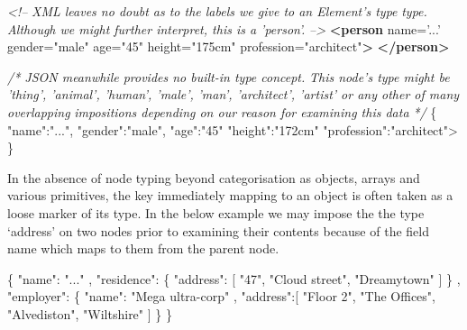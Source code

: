 \documentclass[12pt, ]{article}
\newenvironment{Shaded}{}{}
\newcommand{\KeywordTok}[1]{\textcolor[rgb]{0.00,0.44,0.13}{\textbf{{#1}}}}
\newcommand{\StringTok}[1]{\textcolor[rgb]{0.25,0.44,0.63}{{#1}}}
\newcommand{\CommentTok}[1]{\textcolor[rgb]{0.38,0.63,0.69}{\textit{{#1}}}}
\newcommand{\OtherTok}[1]{\textcolor[rgb]{0.00,0.44,0.13}{{#1}}}
\newcommand{\NormalTok}[1]{{#1}}
\begin{document}
\begin{Shaded}
\begin{Highlighting}[]
\CommentTok{<!--  }
\CommentTok{  XML leaves no doubt as to the labels we give to an Element's type }
\CommentTok{  type. Although we might further interpret, this is a 'person'.}
\CommentTok{-->}
\KeywordTok{<person}\OtherTok{  name=}\StringTok{'...'}\OtherTok{ gender=}\StringTok{"male"}
\OtherTok{         age=}\StringTok{"45"}\OtherTok{ height=}\StringTok{"175cm"}\OtherTok{ profession=}\StringTok{"architect"}\KeywordTok{>}
\KeywordTok{</person>}
\end{Highlighting}
\end{Shaded}

\begin{Shaded}
\begin{Highlighting}[]
\CommentTok{/* JSON meanwhile provides no built-in type concept. }
\CommentTok{   This node's type might be 'thing', 'animal', 'human', 'male',}
\CommentTok{   'man', 'architect', 'artist' or any other of many overlapping}
\CommentTok{   impositions depending on our reason for examining this data}
\CommentTok{*/}
\NormalTok{\{  }\StringTok{"name"}\NormalTok{:}\StringTok{"..."}\NormalTok{, }\StringTok{"gender"}\NormalTok{:}\StringTok{"male"}\NormalTok{, }\StringTok{"age"}\NormalTok{:}\StringTok{"45"} 
   \StringTok{"height"}\NormalTok{:}\StringTok{"172cm"} \StringTok{"profession"}\NormalTok{:}\StringTok{"architect"}\NormalTok{>}
\NormalTok{\}         }
\end{Highlighting}
\end{Shaded}

In the absence of node typing beyond categorisation as objects, arrays
and various primitives, the key immediately mapping to an object is
often taken as a loose marker of its type. In the below example we may
impose the the type `address' on two nodes prior to examining their
contents because of the field name which maps to them from the parent
node.

\begin{Shaded}
\begin{Highlighting}[]
\NormalTok{\{}
   \StringTok{"name"}\NormalTok{: }\StringTok{"..."}
\NormalTok{,  }\StringTok{"residence"}\NormalTok{: \{}
      \StringTok{"address"}\NormalTok{: [}
         \StringTok{"47"}\NormalTok{, }\StringTok{"Cloud street"}\NormalTok{, }\StringTok{"Dreamytown"}
      \NormalTok{]}
   \NormalTok{\}}
\NormalTok{,  }\StringTok{"employer"}\NormalTok{: \{}
      \StringTok{"name"}\NormalTok{: }\StringTok{"Mega ultra-corp"}
   \NormalTok{,  }\StringTok{"address"}\NormalTok{:[}
         \StringTok{"Floor 2"}\NormalTok{, }\StringTok{"The Offices"}\NormalTok{, }\StringTok{"Alvediston"}\NormalTok{, }\StringTok{"Wiltshire"}      
      \NormalTok{]}
   \NormalTok{\}   }
\NormalTok{\}}
\end{Highlighting}
\end{Shaded}
\end{document}
